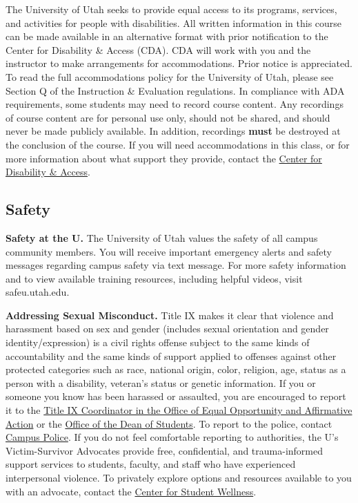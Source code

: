 \documentclass[
  letterpaper,
]{article}
\begin{document}
The University of Utah seeks to provide equal access to its programs,
services, and activities for people with disabilities. All written
information in this course can be made available in an alternative
format with prior notification to the Center for Disability \& Access
(CDA). CDA will work with you and the instructor to make arrangements
for accommodations. Prior notice is appreciated. To read the full
accommodations policy for the University of Utah, please see Section Q
of the Instruction \& Evaluation regulations. In compliance with ADA
requirements, some students may need to record course content. Any
recordings of course content are for personal use only, should not be
shared, and should never be made publicly available. In addition,
recordings \textbf{must} be destroyed at the conclusion of the course.
If you will need accommodations in this class, or for more information
about what support they provide, contact the
\href{https://disability.utah.edu/}{Center for Disability \& Access}.

\hypertarget{safety}{%
\subsection{Safety}\label{safety}}

\textbf{Safety at the U.} The University of Utah values the safety of
all campus community members. You will receive important emergency
alerts and safety messages regarding campus safety via text message. For
more safety information and to view available training resources,
including helpful videos, visit safeu.utah.edu.

\textbf{Addressing Sexual Misconduct.} Title IX makes it clear that
violence and harassment based on sex and gender (includes sexual
orientation and gender identity/expression) is a civil rights offense
subject to the same kinds of accountability and the same kinds of
support applied to offenses against other protected categories such as
race, national origin, color, religion, age, status as a person with a
disability, veteran's status or genetic information. If you or someone
you know has been harassed or assaulted, you are encouraged to report it
to the \href{https://oeo.utah.edu/}{Title IX Coordinator in the Office
of Equal Opportunity and Affirmative Action} or the
\href{https://deanofstudents.utah.edu/}{Office of the Dean of Students}.
To report to the police, contact \href{https://dps.utah.edu/}{Campus
Police}. If you do not feel comfortable reporting to authorities, the
U's Victim-Survivor Advocates provide free, confidential, and
trauma-informed support services to students, faculty, and staff who
have experienced interpersonal violence. To privately explore options
and resources available to you with an advocate, contact the
\href{http://wellness.utah.edu/}{Center for Student Wellness}.
\end{document}
